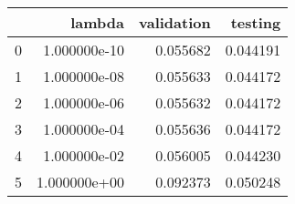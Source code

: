 \begin{tabular}{lrrr}
\toprule
{} &        lambda &  validation &   testing \\
\midrule
0 &  1.000000e-10 &    0.055682 &  0.044191 \\
1 &  1.000000e-08 &    0.055633 &  0.044172 \\
2 &  1.000000e-06 &    0.055632 &  0.044172 \\
3 &  1.000000e-04 &    0.055636 &  0.044172 \\
4 &  1.000000e-02 &    0.056005 &  0.044230 \\
5 &  1.000000e+00 &    0.092373 &  0.050248 \\
\bottomrule
\end{tabular}
